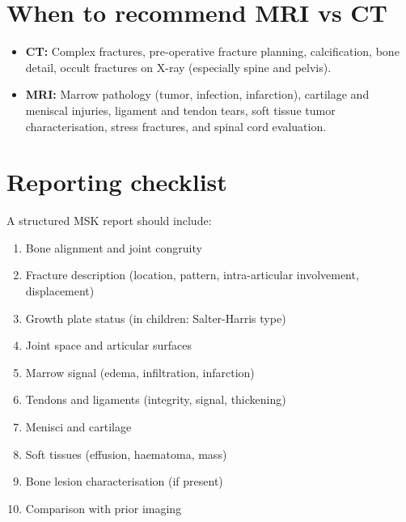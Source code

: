 \section{When to recommend MRI vs CT}
\begin{itemize}
    \item \textbf{CT:} Complex fractures, pre-operative fracture planning, calcification, bone detail, occult fractures on X-ray (especially spine and pelvis).
    \item \textbf{MRI:} Marrow pathology (tumor, infection, infarction), cartilage and meniscal injuries, ligament and tendon tears, soft tissue tumor characterisation, stress fractures, and spinal cord evaluation.
\end{itemize}

\section{Reporting checklist}
A structured MSK report should include:
\begin{enumerate}
    \item Bone alignment and joint congruity
    \item Fracture description (location, pattern, intra-articular involvement, displacement)
    \item Growth plate status (in children: Salter-Harris type)
    \item Joint space and articular surfaces
    \item Marrow signal (edema, infiltration, infarction)
    \item Tendons and ligaments (integrity, signal, thickening)
    \item Menisci and cartilage
    \item Soft tissues (effusion, haematoma, mass)
    \item Bone lesion characterisation (if present)
    \item Comparison with prior imaging
\end{enumerate}

\clearpage
